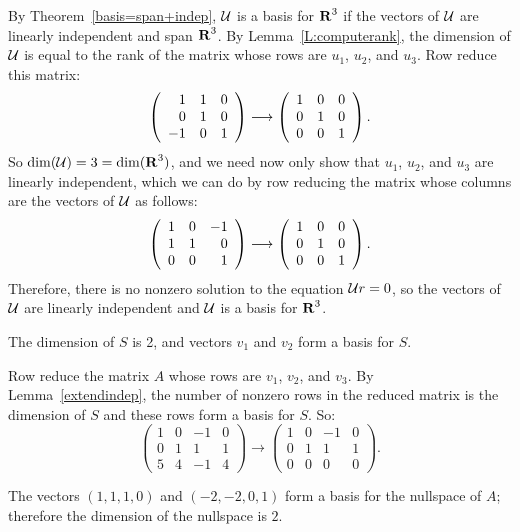 By Theorem~\ref{basis=span+indep},
${\cal U}$ is a basis for $\mbox{$\bf{R}$}^3$ if the vectors of ${\cal U}$ are
linearly independent and span $\mbox{$\bf{R}$}^3$.  By Lemma~\ref{L:computerank},
the dimension of ${\cal U}$ is equal to the rank of the matrix whose
rows are $u_1$, $u_2$, and $u_3$.  Row reduce this matrix:
\[
\left(\begin{array}{rrr} 1 & 1 & 0 \\ 0 & 1 & 0 \\ -1 & 0 & 1\end{array}\right) \longrightarrow
\left(\begin{array}{rrr} 1 & 0 & 0 \\ 0 & 1 & 0 \\ 0 & 0 & 1\end{array}\right).
\]
So $\dim({\cal U}) = 3 = \dim(\mbox{$\bf{R}$}^3)$, and we need now only show that
$u_1$, $u_2$, and $u_3$ are linearly independent, which we can do by
row reducing the matrix whose columns are the vectors of ${\cal U}$ as
follows:
\[
\left(\begin{array}{rrr} 1 & 0 & -1 \\ 1 & 1 & 0 \\ 0 & 0 & 1\end{array}\right) \longrightarrow
\left(\begin{array}{rrr} 1 & 0 & 0 \\ 0 & 1 & 0 \\ 0 & 0 & 1\end{array}\right).
\]
Therefore, there is no nonzero solution to the equation
${\cal U}r = 0$, so the vectors of ${\cal U}$ are linearly independent
and ${\cal U}$ is a basis for $\mbox{$\bf{R}$}^3$.

\ans The dimension of $S$ is 2, and vectors $v_1$ and $v_2$ form a
basis for $S$.

\soln Row reduce the matrix $A$ whose rows are $v_1$, $v_2$, and $v_3$. 
By Lemma~\ref{extendindep}, the number
of nonzero rows in the reduced matrix is the dimension of $S$ and these
rows form a basis for $S$.  So:
\[
\left(\begin{array}{rrrr} 1 & 0 & -1 & 0 \\ 0 & 1 & 1 & 1 \\ 5
& 4 & -1 & 4 \end{array}\right) \longrightarrow \left(\begin{array}
{rrrr} 1& 0 & -1 & 0 \\ 0 & 1 & 1 & 1 \\ 0 & 0 & 0 & 0
\end{array}\right).
\]

\ans The vectors $(1,1,1,0)$ and $(-2,-2,0,1)$ form a basis for the
nullspace of $A$; therefore the dimension of the nullspace is $2$.

